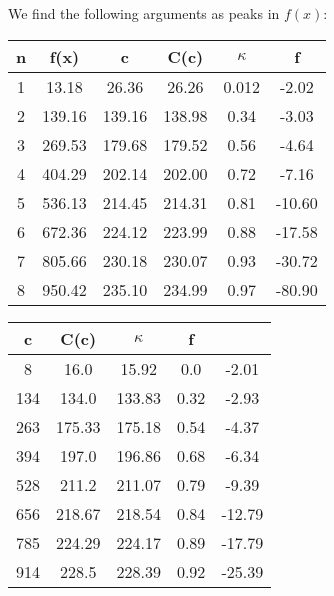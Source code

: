 \documentclass[../main.tex]{subfiles}
\begin{document}
        We find the following arguments as peaks in $f(x)$:
        \begin{table}[H]
            \centering
            \begin{tabular}{c|c|c|c|c|c}
                n & f(x)    & c       & C(c)    & $\kappa$ & f\\
                \hline
                1 & 13.18   & 26.36   & 26.26   & 0.012 & -2.02 \\
                2 & 139.16  & 139.16  & 138.98  & 0.34  & -3.03  \\
                3 & 269.53  & 179.68  & 179.52  & 0.56  & -4.64  \\
                4 & 404.29  & 202.14  & 202.00  & 0.72  & -7.16  \\
                5 & 536.13  & 214.45  & 214.31  & 0.81  & -10.60 \\
                6 & 672.36  & 224.12  & 223.99  & 0.88  & -17.58 \\
                7 & 805.66  & 230.18  & 230.07  & 0.93  & -30.72 \\
                8 & 950.42  & 235.10  & 234.99  & 0.97  & -80.90
            \end{tabular}
        \end{table}

        \begin{table}[H]
            \centering
            \begin{tabular}{ccccc}
                c & C(c) & $\kappa$ & f\\
                \hline
                8 & 16.0 & 15.92 & 0.0 & -2.01	\\
                134 & 134.0 & 133.83 & 0.32 & -2.93	\\
                263 & 175.33 & 175.18 & 0.54 & -4.37	\\
                394 & 197.0 & 196.86 & 0.68 & -6.34	\\
                528 & 211.2 & 211.07 & 0.79 & -9.39	\\
                656 & 218.67 & 218.54 & 0.84 & -12.79	\\
                785 & 224.29 & 224.17 & 0.89 & -17.79	\\
                914 & 228.5 & 228.39 & 0.92 & -25.39	\\
            \end{tabular}
        \end{table}

        
\end{document}
